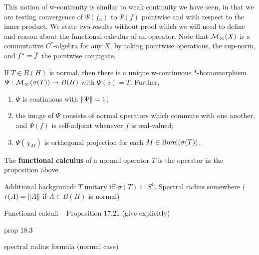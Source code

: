 \documentclass[10pt]{amsart}
\begin{document}
This notion of w-continuity is similar to weak continuity we have seen, in that we are testing convergence of $\Psi(f_n)$ to $\Psi(f)$ pointwise and with respect to the inner product. We state two results without proof which we will need to define and reason about the functional calculus of an operator. Note that $\mathcal{M}_\infty(X)$ is a commutative $C^*$-algebra for any $X$, by taking pointwise operations, the sup-norm, and $f^* = \overline{f}$ the pointwise conjugate.
\begin{proposition}\label{funccalc}
    If $T \in B(H)$ is normal, then there is a unique w-continuous $*$-homomorphism $\Psi : \mathcal{M}_\infty(\sigma(T)) \to B(H)$ with $\Psi(z) = T$. Further, 
    \begin{enumerate}
        \item $\Psi$ is continuous with $\left\| \Psi \right\| = 1$;
        \item the image of $\Psi$ consists of normal operators which commute with one another, and $\Psi(f)$ is self-adjoint whenever $f$ is real-valued;
        \item $\Psi(\chi_M)$ is orthogonal projection for each $M \in \operatorname{Borel}(\sigma(T))$.
    \end{enumerate}
\end{proposition}
\begin{definition}
    The \textbf{functional calculus} of a normal operator $T$ is the operator in the proposition above.
\end{definition}
Additional background: $T$ unitary iff $\sigma(T) \subseteq S^1$. Spectral radius somewhere ($r(A) = \left\| A \right\|$ if $A \in B(H)$ is normal)

Functional calculi -- Proposition 17.21 (give explicitly)

prop 18.3

spectral radius formula (normal case)
\end{document}
